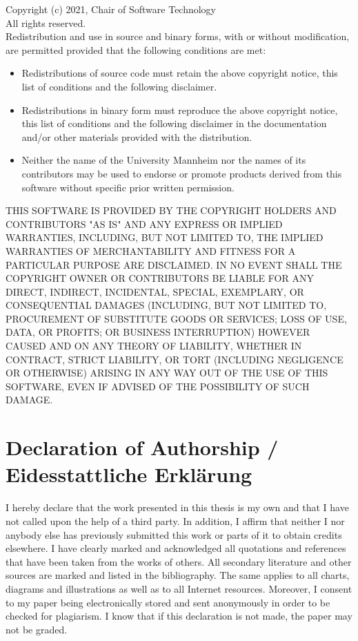 \begin{appendices}
\begin{framed}
\begin{doublespace}
Copyright (c) 2021, Chair of Software Technology\\
All rights reserved.\\
Redistribution and use in source and binary forms, with or without modification, are permitted provided that the following conditions are met:\\
\begin{itemize}
\item Redistributions of source code must retain the above copyright notice, this list of conditions and the following disclaimer.
\item Redistributions in binary form must reproduce the above copyright notice, this list of conditions and the following disclaimer in the documentation and/or other materials provided with the distribution.
\item Neither the name of the University Mannheim nor the names of its contributors may be used to endorse or promote products derived from this software without specific prior written permission.
\end{itemize}

THIS SOFTWARE IS PROVIDED BY THE COPYRIGHT HOLDERS AND CONTRIBUTORS "AS IS" AND ANY EXPRESS OR IMPLIED WARRANTIES, INCLUDING, BUT NOT LIMITED TO, THE IMPLIED WARRANTIES OF MERCHANTABILITY AND FITNESS FOR A PARTICULAR PURPOSE ARE DISCLAIMED. IN NO EVENT SHALL THE COPYRIGHT OWNER OR CONTRIBUTORS BE LIABLE FOR ANY DIRECT, INDIRECT, INCIDENTAL, SPECIAL, EXEMPLARY, OR CONSEQUENTIAL DAMAGES (INCLUDING, BUT NOT LIMITED TO, PROCUREMENT OF SUBSTITUTE GOODS OR SERVICES; LOSS OF USE, DATA, OR PROFITS; OR BUSINESS INTERRUPTION) HOWEVER CAUSED AND ON ANY THEORY OF LIABILITY, WHETHER IN CONTRACT, STRICT LIABILITY, OR TORT (INCLUDING NEGLIGENCE OR OTHERWISE) ARISING IN ANY WAY OUT OF THE USE OF THIS SOFTWARE, EVEN IF ADVISED OF THE POSSIBILITY OF SUCH DAMAGE.
\end{doublespace}
\end{framed}

\clearpage

\section{\large Declaration of Authorship / Eidesstattliche Erkl\"{a}rung}
\pagestyle{empty}
I hereby declare that the work presented in this thesis is my own and that I have not called upon the help of a third party. In addition, I affirm that neither I nor anybody else has previously submitted this work or parts of it to obtain credits elsewhere. I have clearly marked and acknowledged all quotations and references that have been taken from the works of others. All secondary literature and other sources are marked and listed in the bibliography. The same applies to all charts, diagrams and illustrations as well as to all Internet resources. Moreover, I consent to my paper being electronically stored and sent anonymously in order to be checked for plagiarism. I know that if this declaration is not made, the paper may not be graded.


\end{appendices}
